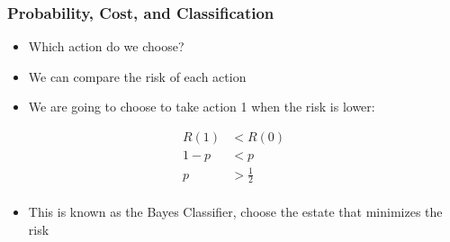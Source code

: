 \documentclass[
  shownotes,
  xcolor={svgnames},
  hyperref={colorlinks,citecolor=DarkBlue,linkcolor=DarkRed,urlcolor=DarkBlue}
  , aspectratio=169]{beamer}
\begin{document}
\begin{frame}[fragile]
\frametitle{Probability, Cost, and Classification}

\begin{itemize}
  \item Which action do we choose?
 \bigskip
 \pause
  \item We can compare the risk of each action
  \medskip
  \item We are going to choose to take action 1 when the risk is lower:
\end{itemize}

\begin{align}
R(1) &< R(0) \\ \nonumber
1-p &< p \\ \nonumber
p &> \frac{1}{2} \\ \nonumber
\end{align}

\begin{itemize}
  \item This is known as the Bayes Classifier, choose the estate that minimizes the risk
\end{itemize}
\end{frame}
\end{document}
